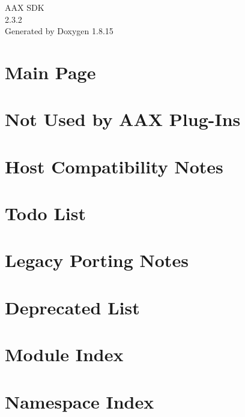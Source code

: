 \let\mypdfximage\pdfximage\def\pdfximage{\immediate\mypdfximage}\documentclass[twoside]{book}
\newcommand{\+}{\discretionary{\mbox{\scriptsize$\hookleftarrow$}}{}{}}
\newcommand{\clearemptydoublepage}{%
  \newpage{\pagestyle{empty}\cleardoublepage}%
}
\begin{document}
\hypersetup{pageanchor=false,
             bookmarksnumbered=true,
             pdfencoding=unicode
            }
\begin{titlepage}
\vspace*{7cm}
\begin{center}%
{\Large A\+AX S\+DK \\[1ex]\large 2.\+3.\+2 }\\
\vspace*{1cm}
{\large Generated by Doxygen 1.8.15}\\
\end{center}
\end{titlepage}
\clearemptydoublepage
{}
\tableofcontents
\clearemptydoublepage
{}
\hypersetup{pageanchor=true}

\chapter{Main Page}
\label{index}\hypertarget{index}{}
\chapter{Not Used by A\+AX Plug-\/\+Ins}
\label{a00789}

\chapter{Host Compatibility Notes}
\label{a00786}

\chapter{Todo List}
\label{a00785}

\chapter{Legacy Porting Notes}
\label{a00787}

\chapter{Deprecated List}
\label{a00788}

\chapter{Module Index}

\chapter{Namespace Index}

\end{document}

